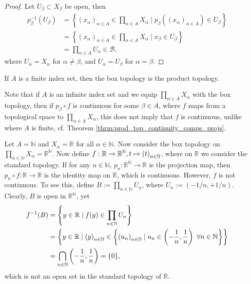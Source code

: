 \begin{proof}
	Let $U_{\beta}\subset X_{\beta}$ be open, then
	\begin{align*}
		p_{\beta}^{-1}(U_\beta) &= \left\{ (x_{\alpha})_{\alpha\in A}\in \prod_{\alpha\in A}X_{\alpha}\mid p_{\beta}\left((x_{\alpha})_{\alpha\in A}\right)\in U_{\beta} \right\} 
		\\ &= \left\{ (x_{\alpha})_{\alpha\in A}\in \prod_{\alpha\in A}X_{\alpha}\mid x_{\beta}\in U_{\beta} \right\}
		\\ &= \prod_{\alpha\in A}U_{\alpha}\in \mathscr B,
	\end{align*}
	where $U_{\alpha} = X_{\alpha}$ for $\alpha\ne\beta$, and $U_{\alpha} = U_{\beta}$ for $\alpha= \beta$.
\end{proof}

\begin{remark}
	If $A$ is a finite index set, then the box topology is the product topology.
\end{remark}

\begin{remark}
	Note that if $A$ is an infinite index set and we equip $\prod_{\alpha\in A}X_{\alpha}$ with the box topology, then if $p_{\beta}\circ f$ is continuous for some $\beta\in A$, where $f$ maps from a topological space to $\prod_{\alpha\in A}X_{\alpha}$, this does not imply that $f$ is continuous, unlike where $A$ is finite, cf. Theorem \ref{thrm:prod_top_continuity_comps_projs}.
\end{remark}

\begin{exmp}
	Let $A = \mathbb N$ and $X_{\alpha} = \mathbb R$ for all $\alpha\in\mathbb N$. Now consider the box topology on $\prod_{\alpha\in\mathbb N}X_{\alpha} = \mathbb R^{\mathbb N}$. Now define $f: \mathbb R\to \mathbb R^{\mathbb N}, t\mapsto \seq[t]$, where on $\mathbb R$ we consider the standard topology. If for any $n\in\mathbb N$, $p_n: \mathbb R^{\mathbb N}\to \mathbb R$ is the projection map, then $p_n\circ f: \mathbb R\to\mathbb R$ is the identity map on $\mathbb R$, which is continuous. However, $f$ is not continuous. To see this, define $B := \prod_{n\in\mathbb N}U_n$, where $U_n := (-1/n, +1/n)$. Clearly, $B$ is open in $\mathbb R^{\mathbb N}$, yet 
	\begin{align*}
		f^{-1}(B) &= \left\{y\in\mathbb R\mid f(y)\in \prod_{n\in\mathbb N}U_n\right\} 
		\\ &= \left\{ y\in\mathbb R\mid \seq[y]\in \left\{\seq[u_n]\mid u_n\in \left(-\frac{1}{n}, \frac{1}{n}\right)\ \forall n\in\mathbb N\right\} \right\} 
		\\ &= \bigcap_{n\in\mathbb N}\left(-\frac{1}{n}, \frac{1}{n}\right) = \{0\},
	\end{align*} which is not an open set in the standard topology of $\mathbb R$.
\end{exmp}

